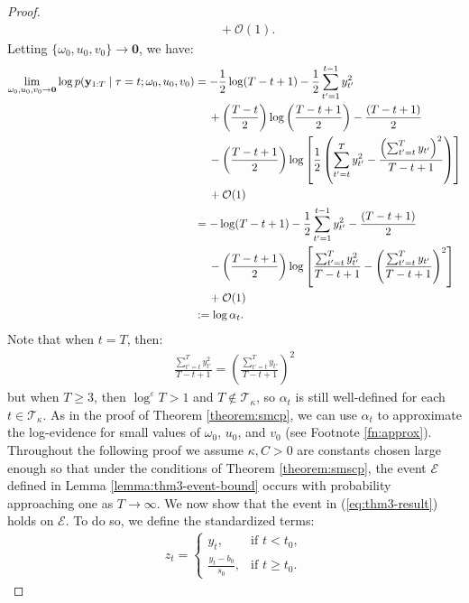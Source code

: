 \begin{proof}
\begin{align*}
    &\quad\:+ \mathcal{O}(1).
\end{align*}
\normalsize
Letting $\{\omega_0,u_0, v_0\} \to \mathbf{0}$, we have:
\small
\begin{align}
    \lim_{\omega_0,u_0, v_0 \to \mathbf{0}}\log p(\mathbf{y}_{1:T} \;|\; \tau = t; \omega_0,u_0,v_0) &= -\frac{1}{2}\log(T - t + 1) - \frac{1}{2}\sum_{t'=1}^{t-1} y_{t'}^2  \notag \\
    &\quad\: + \left(\frac{T-t}{2}\right) \log \left(\frac{T-t+1}{2}\right) - \frac{(T-t+1)}{2}  \notag\\
    &\quad\: - \left(\frac{T - t +1}{2}\right)\log\left[\frac{1}{2}\left(\sum_{t'=t}^T y_{t'}^2 - \frac{\left(\sum_{t'=t}^T y_{t'}\right)^2}{T- t +1}\right) \right] \notag \\
    &\quad\:+ \mathcal{O}(1)\notag \\
    &= -\log(T - t + 1) - \frac{1}{2}\sum_{t'=1}^{t-1} y_{t'}^2  - \frac{(T-t+1)}{2}  \notag\\
    &\quad\: - \left(\frac{T - t +1}{2}\right)\log\left[\frac{\sum_{t'=t}^T y_{t'}^2}{T-t+1} - \left(\frac{\sum_{t'=t}^T y_{t'}}{T-t+1}\right)^2 \right] \notag \\
    &\quad\:+ \mathcal{O}(1)\notag \\
    &:= \log \alpha_t. \label{eq:thm3-delta_t}
\end{align}
\normalsize
Note that when $t = T$, then:
\begin{align*}
    \frac{\sum_{t'=t}^T y_{t'}^2}{T-t+1} = \left(\frac{\sum_{t'=t}^T y_{t'}}{T-t+1}\right)^2  
\end{align*}
but when $T \geq 3$, then $\log^\varepsilon T > 1$ and $T \not\in \mathcal{T}_\kappa$, so $\alpha_t$ is still well-defined for each $t\in\mathcal{T}_\kappa$. As in the proof of Theorem \ref{theorem:smcp}, we can use $\alpha_t$ to approximate the log-evidence for small values of $\omega_0$, $u_0$, and $v_0$ (see Footnote \ref{fn:approx}). Throughout the following proof we assume $\kappa,C >0$ are constants chosen large enough so that under the conditions of Theorem \ref{theorem:smscp}, the event $\mathcal{E}$ defined in Lemma \ref{lemma:thm3-event-bound} occurs with probability approaching one as $T\to\infty$. We now show that the event in (\ref{eq:thm3-result}) holds on $\mathcal{E}$. To do so, we define the standardized terms: 
\begin{align*}
    z_t = 
    \begin{cases}
        y_t, & \text{if } t < t_0, \\
        \frac{y_t - b_0}{s_0},& \text{if } t \geq t_0.

\end{cases}
\end{align*}
\end{proof}

